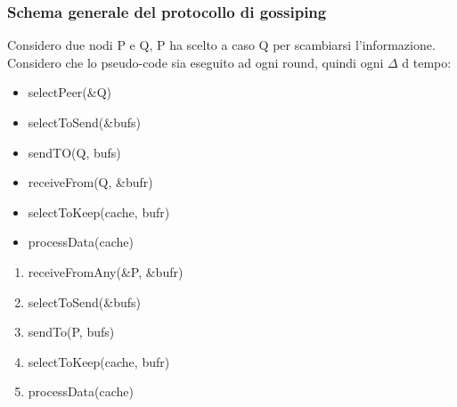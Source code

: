 \documentclass[16px]{article}
\begin{document}
\subsubsection{Schema generale del protocollo di gossiping}
Considero due nodi P e Q, P ha scelto a caso Q per scambiarsi l'informazione. Considero che lo pseudo-code sia eseguito ad ogni round, quindi ogni $\Delta$ d tempo:
\begin{itemize}
\item selectPeer(\&Q)
\item selectToSend(\&bufs)
\item sendTO(Q, bufs)
\item receiveFrom(Q, \&bufr)
\item selectToKeep(cache, bufr)
\item processData(cache)
\end{itemize}
\begin{enumerate}
\item receiveFromAny(\&P, \&bufr)
\item selectToSend(\&bufs)
\item sendTo(P, bufs)
\item selectToKeep(cache, bufr)
\item processData(cache)
\end{enumerate}
\end{document}

